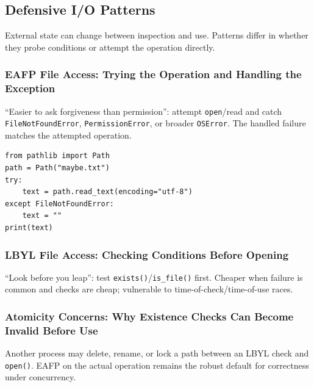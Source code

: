 \subsection{Defensive I/O Patterns}

External state can change between inspection and use. Patterns differ in whether they probe conditions or attempt the operation directly.

\subsubsection{EAFP File Access: Trying the Operation and Handling the Exception}

``Easier to ask forgiveness than permission'': attempt \texttt{open}/read and catch \texttt{FileNotFoundError}, \texttt{PermissionError}, or broader \texttt{OSError}. The handled failure matches the attempted operation.

\begin{verbatim}
from pathlib import Path
path = Path("maybe.txt")
try:
    text = path.read_text(encoding="utf-8")
except FileNotFoundError:
    text = ""
print(text)
\end{verbatim}

\subsubsection{LBYL File Access: Checking Conditions Before Opening}

``Look before you leap'': test \texttt{exists()}/\texttt{is\_file()} first. Cheaper when failure is common and checks are cheap; vulnerable to time-of-check/time-of-use races.

\subsubsection{Atomicity Concerns: Why Existence Checks Can Become Invalid Before Use}

Another process may delete, rename, or lock a path between an LBYL check and \texttt{open()}. EAFP on the actual operation remains the robust default for correctness under concurrency.
